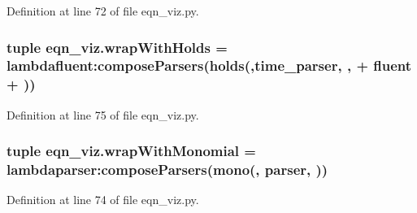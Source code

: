 Definition at line 72 of file eqn\+\_\+viz.\+py.

\hypertarget{namespaceeqn__viz_a66245c2eeb429b7809bc02fc6852d0ec}{}
\subsubsection[{wrap\+With\+Holds}]{\setlength{\rightskip}{0pt plus 5cm}tuple eqn\+\_\+viz.\+wrap\+With\+Holds = lambdafluent\+:compose\+Parsers(\textquotesingle{}holds(\textquotesingle{},{\bf time\+\_\+parser}, \textquotesingle{},\textquotesingle{} + fluent + \textquotesingle{})\textquotesingle{})}\label{namespaceeqn__viz_a66245c2eeb429b7809bc02fc6852d0ec}


Definition at line 75 of file eqn\+\_\+viz.\+py.

\hypertarget{namespaceeqn__viz_afead5f7b23dd83ce8d2c7092b9887606}{}
\subsubsection[{wrap\+With\+Monomial}]{\setlength{\rightskip}{0pt plus 5cm}tuple eqn\+\_\+viz.\+wrap\+With\+Monomial = lambdaparser\+:compose\+Parsers(\textquotesingle{}mono(\textquotesingle{}, parser, \textquotesingle{})\textquotesingle{})}\label{namespaceeqn__viz_afead5f7b23dd83ce8d2c7092b9887606}


Definition at line 74 of file eqn\+\_\+viz.\+py.

